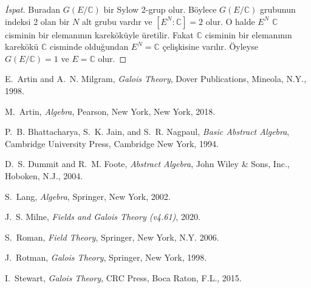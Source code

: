 \documentclass{article}
\theoremstyle{definition}
\theoremstyle{remark}
\begin{document}
\begin{proof}[İspat]
    			Buradan $G(E/\mathbb{C})$ bir Sylow 2-grup olur. Böylece $G(E/\mathbb{C})$ grubunun indeksi 2 olan bir $N$ alt grubu vardır ve $[E^N : \mathbb{C}] = 2$ olur. O halde $E^N$ $\mathbb{C}$ cisminin bir elemanının kareköküyle üretilir. Fakat $\mathbb{C}$ cisminin bir elemanının karekökü $\mathbb{C}$ cisminde olduğundan $E^N = \mathbb{C}$ çelişkisine varılır. Öyleyse $G(E/\mathbb{C}) = 1$ ve $E = \mathbb{C}$ olur.
    	    \end{proof}
	        
\newpage

    \begin{thebibliography}{10}
    
			E.~Artin and A.~N. Milgram, \emph{Galois Theory}, Dover Publications, Mineola, N.Y., 1998.
			
			M.~Artin, \emph{Algebra}, Pearson, New York, New York, 2018.
			
			P.~B. Bhattacharya, S.~K. Jain, and S.~R. Nagpaul, \emph{Basic Abstract Algebra}, Cambridge University Press, Cambridge New York, 1994.
			
			D.~S. Dummit and R.~M. Foote, \emph{Abstract Algebra}, John Wiley \& Sons, Inc., Hoboken, N.J., 2004.
			
			S.~Lang, \emph{Algebra}, Springer, New York, 2002.
			
			J.~S. Milne, \emph{Fields and Galois Theory (v4.61)}, 2020.
			
			S.~Roman, \emph{Field Theory}, Springer, New York, N.Y. 2006.
			
			J.~Rotman, \emph{Galois Theory}, Springer, New York, 1998.
			
			I.~Stewart, \emph{Galois Theory}, CRC Press, Boca Raton, F.L., 2015.
    	
    \end{thebibliography}
	
\end{document}
